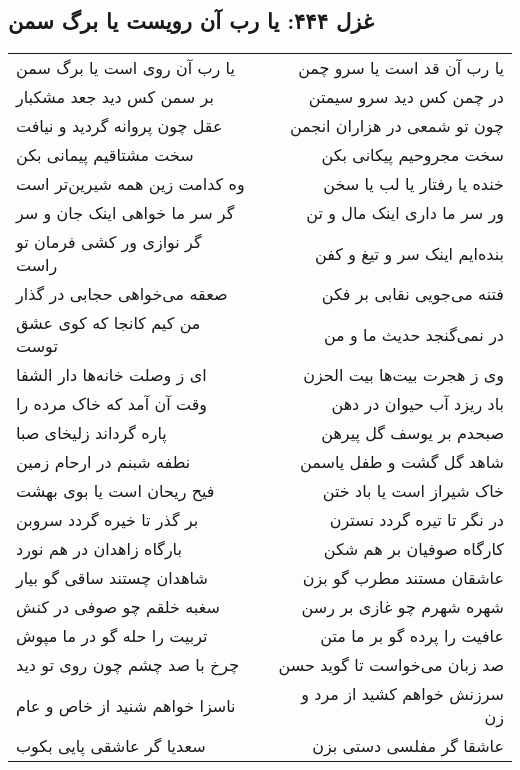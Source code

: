 \begin{center}
\section*{غزل ۴۴۴: یا رب آن رویست یا برگ سمن}
\label{sec:444}
\begin{longtable}{l p{0.5cm} r}
یا رب آن روی است یا برگ سمن
&&
یا رب آن قد است یا سرو چمن
\\
بر سمن کس دید جعد مشکبار
&&
در چمن کس دید سرو سیمتن
\\
عقل چون پروانه گردید و نیافت
&&
چون تو شمعی در هزاران انجمن
\\
سخت مشتاقیم پیمانی بکن
&&
سخت مجروحیم پیکانی بکن
\\
وه کدامت زین همه شیرین‌تر است
&&
خنده یا رفتار یا لب یا سخن
\\
گر سر ما خواهی اینک جان و سر
&&
ور سر ما داری اینک مال و تن
\\
گر نوازی ور کشی فرمان تو راست
&&
بنده‌ایم اینک سر و تیغ و کفن
\\
صعقه می‌خواهی حجابی در گذار
&&
فتنه می‌جویی نقابی بر فکن
\\
من کیم کانجا که کوی عشق توست
&&
در نمی‌گنجد حدیث ما و من
\\
ای ز وصلت خانه‌ها دار الشفا
&&
وی ز هجرت بیت‌ها بیت الحزن
\\
وقت آن آمد که خاک مرده را
&&
باد ریزد آب حیوان در دهن
\\
پاره گرداند زلیخای صبا
&&
صبحدم بر یوسف گل پیرهن
\\
نطفه شبنم در ارحام زمین
&&
شاهد گل گشت و طفل یاسمن
\\
فیح ریحان است یا بوی بهشت
&&
خاک شیراز است یا باد ختن
\\
بر گذر تا خیره گردد سروبن
&&
در نگر تا تیره گردد نسترن
\\
بارگاه زاهدان در هم نورد
&&
کارگاه صوفیان بر هم شکن
\\
شاهدان چستند ساقی گو بیار
&&
عاشقان مستند مطرب گو بزن
\\
سغبه خلقم چو صوفی در کنش
&&
شهره شهرم چو غازی بر رسن
\\
تربیت را حله گو در ما مپوش
&&
عافیت را پرده گو بر ما متن
\\
چرخ با صد چشم چون روی تو دید
&&
صد زبان می‌خواست تا گوید حسن
\\
ناسزا خواهم شنید از خاص و عام
&&
سرزنش خواهم کشید از مرد و زن
\\
سعدیا گر عاشقی پایی بکوب
&&
عاشقا گر مفلسی دستی بزن
\\
\end{longtable}
\end{center}
